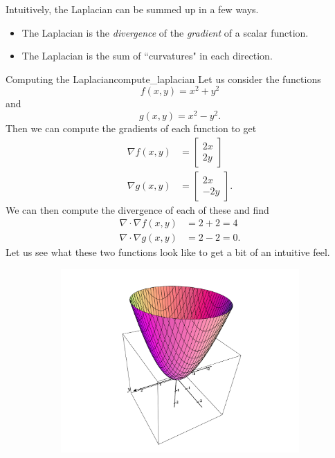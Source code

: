         Intuitively, the Laplacian can be summed up in a few ways. 
        \begin{itemize}
            \item The Laplacian is the \emph{divergence} of the \emph{gradient} of a scalar function.
            \item The Laplacian is the sum of ``curvatures" in each direction.
        \end{itemize}
        
        \begin{ex}{Computing the Laplacian}{compute_laplacian}
        Let us consider the functions
        \[
        f(x,y) = x^2+y^2
        \]
        and
        \[
        g(x,y) = x^2-y^2.
        \]
        Then we can compute the gradients of each function to get
        \begin{align*}
            \nabla f(x,y) &= \begin{bmatrix} 2x \\ 2y \end{bmatrix}\\
            \nabla g(x,y) &= \begin{bmatrix} 2x \\ -2y \end{bmatrix}.
        \end{align*}
        We can then compute the divergence of each of these and find
        \begin{align*}
            \nabla \cdot \nabla f(x,y) &= 2+2 = 4\\
            \nabla \cdot \nabla g(x,y) &= 2-2 =0.
        \end{align*}
        Let us see what these two functions look like to get a bit of an intuitive feel.
        \begin{figure}[H]
            \centering
            \begin{subfigure}[h]{.45\textwidth}
            \includegraphics[width=\textwidth]{Figures_Part_6/pos_laplace.png}

\end{subfigure}
\end{figure}
\end{ex}

